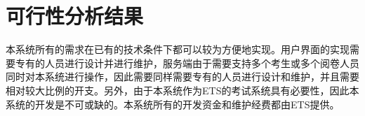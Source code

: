 \chapter{可行性分析结果}
本系统所有的需求在已有的技术条件下都可以较为方便地实现。用户界面的实现需要专有的人员进行设计并进行维护，服务端由于需要支持多个考生或多个阅卷人员同时对本系统进行操作，因此需要同样需要专有的人员进行设计和维护，并且需要相对较大比例的开支。另外，由于本系统作为ETS的考试系统具有必要性，因此本系统的开发是不可或缺的。本系统所有的开发资金和维护经费都由ETS提供。